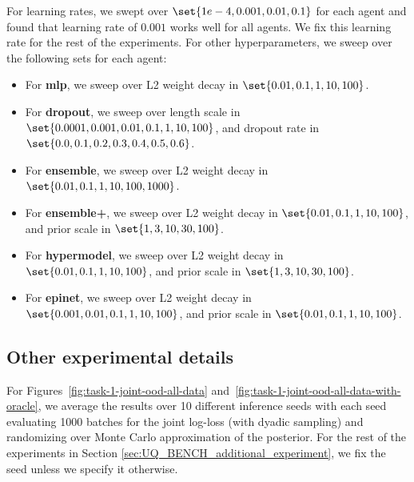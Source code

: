 For learning rates, we swept over $\set{1e-4, 0.001, 0.01,0.1 }$ for each agent and found that learning rate of $0.001$ works well for all agents. We fix this learning rate for the rest of the experiments. For other hyperparameters, we sweep over the following sets for each agent:
\begin{itemize}
    \item For \textbf{mlp}, we sweep over L2 weight decay in $\set{0.01, 0.1, 1, 10, 100}$.
    \item For \textbf{dropout}, we sweep over  length scale in $\set{0.0001, 0.001, 0.01, 0.1, 1, 10, 100}$, and dropout rate in $\set{0.0, 0.1, 0.2, 0.3, 0.4, 0.5, 0.6}$.
    \item For \textbf{ensemble}, we sweep over L2 weight decay in $\set{0.01, 0.1, 1, 10, 100, 1000}$.
    \item For \textbf{ensemble+}, we sweep over  L2 weight decay in $\set{0.01, 0.1, 1, 10, 100}$, and prior scale in $\set{1, 3, 10, 30, 100}$.
    \item For \textbf{hypermodel}, we sweep over  L2 weight decay in $\set{0.01, 0.1, 1, 10, 100}$, and prior scale in $\set{1, 3, 10, 30, 100}$.
    \item For \textbf{epinet}, we sweep over L2 weight decay in $\set{0.001, 0.01, 0.1, 1, 10, 100}$, and prior scale in $\set{0.01, 0.1, 1, 10, 100}$.
\end{itemize}



\subsection{Other experimental details}
For Figures~\ref{fig:task-1-joint-ood-all-data} 
and~\ref{fig:task-1-joint-ood-all-data-with-oracle},  we average the results over 10 different inference seeds  with each seed evaluating 1000 batches for the joint log-loss (with dyadic sampling) and randomizing over Monte Carlo approximation of the posterior.  
For the rest of the experiments in Section \ref{sec:UQ_BENCH_additional_experiment}, we fix the seed unless we specify it otherwise. 

 

